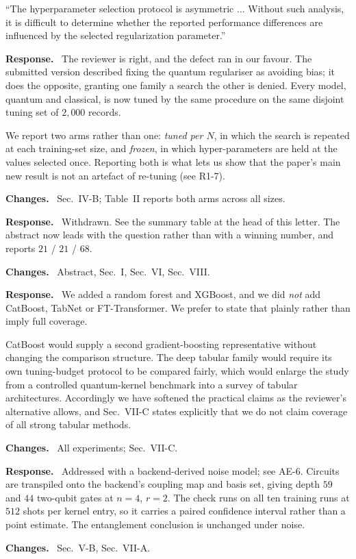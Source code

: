 \documentclass[11pt,a4paper]{article}
\newenvironment{revcomment}
  {\par\addvspace{6pt}\begingroup
   \color{quotegray}\itshape\small
   \begin{list}{}{%
     \setlength{\leftmargin}{1.8em}\setlength{\rightmargin}{1.0em}%
     \setlength{\topsep}{0pt}\setlength{\partopsep}{0pt}%
     \setlength{\parsep}{3pt}\setlength{\itemsep}{0pt}}%
   \item[]}
  {\end{list}\endgroup\normalcolor\addvspace{6pt}}
\newcommand{\itemhead}[2]{%
  \par\addvspace{15pt}%
  \noindent{\bfseries\color{tagink}#1}\hspace{0.7em}{\bfseries #2}%
  \par\addvspace{3.5pt}%
  \noindent{\color{rulegray}\rule{\linewidth}{0.5pt}}%
  \par\addvspace{5pt}%
  \nobreak}
\newcommand{\resp}{\par\addvspace{2pt}\noindent\textbf{Response.}\ }
\newcommand{\changed}{\par\addvspace{5pt}\noindent
  {\bfseries\color{tagink}Changes.}\ }
\begin{document}
\itemhead{R1-3}{Asymmetric hyper-parameter protocol: QSVM fixed at $C=1.0$,
classical SVMs validation-selected}
\begin{revcomment}
``The hyperparameter selection protocol is asymmetric $\ldots$ Without such
analysis, it is difficult to determine whether the reported performance
differences are influenced by the selected regularization parameter.''
\end{revcomment}
\resp
The reviewer is right, and the defect ran in our favour. The submitted version
described fixing the quantum regulariser as avoiding bias; it does the opposite,
granting one family a search the other is denied. Every model, quantum and
classical, is now tuned by the same procedure on the same disjoint tuning set of
$2{,}000$ records.

We report two arms rather than one: \emph{tuned per $N$}, in which the search is
repeated at each training-set size, and \emph{frozen}, in which hyper-parameters
are held at the values selected once. Reporting both is what lets us show that
the paper's main new result is not an artefact of re-tuning (see R1-7).
\changed
Sec.~IV-B; Table~II reports both arms across all sizes.

\itemhead{R1-4}{Conclusions overstated; cannot claim general quantum advantage}
\resp
Withdrawn. See the summary table at the head of this letter. The abstract now
leads with the question rather than with a winning number, and reports $21$ /
$21$ / $68$.
\changed
Abstract, Sec.~I, Sec.~VI, Sec.~VIII.

\itemhead{R1-5}{Include XGBoost, CatBoost, TabNet, FT-Transformer, or soften
practical claims}
\resp
We added a random forest and XGBoost, and we did \emph{not} add CatBoost, TabNet
or FT-Transformer. We prefer to state that plainly rather than imply full
coverage.

CatBoost would supply a second gradient-boosting representative without changing
the comparison structure. The deep tabular family would require its own
tuning-budget protocol to be compared fairly, which would enlarge the study from
a controlled quantum-kernel benchmark into a survey of tabular architectures.
Accordingly we have softened the practical claims as the reviewer's alternative
allows, and Sec.~VII-C states explicitly that we do not claim coverage of all
strong tabular methods.
\changed
All experiments; Sec.~VII-C.

\itemhead{R1-6}{NISQ evidence covers only finite-shot error}
\resp
Addressed with a backend-derived noise model; see AE-6. Circuits are transpiled
onto the backend's coupling map and basis set, giving depth $59$ and $44$
two-qubit gates at $n=4$, $r=2$. The check runs on all ten training runs at
$512$ shots per kernel entry, so it carries a paired confidence interval rather
than a point estimate. The entanglement conclusion is unchanged under noise.
\changed
Sec.~V-B, Sec.~VII-A.
\end{document}
